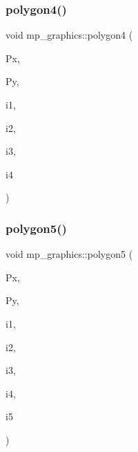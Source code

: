 \mbox{\label{classmp__graphics_acb344e1e44ad9f7fb2d1e8d6ae5bbf53}} 
\subsubsection{\texorpdfstring{polygon4()}{polygon4()}}
{\footnotesize\ttfamily void mp\+\_\+graphics\+::polygon4 (\begin{DoxyParamCaption}\item[{\mbox{\hyperlink{galois_8h_a09fddde158a3a20bd2dcadb609de11dc}{I\+NT}} $\ast$}]{Px,  }\item[{\mbox{\hyperlink{galois_8h_a09fddde158a3a20bd2dcadb609de11dc}{I\+NT}} $\ast$}]{Py,  }\item[{\mbox{\hyperlink{galois_8h_a09fddde158a3a20bd2dcadb609de11dc}{I\+NT}}}]{i1,  }\item[{\mbox{\hyperlink{galois_8h_a09fddde158a3a20bd2dcadb609de11dc}{I\+NT}}}]{i2,  }\item[{\mbox{\hyperlink{galois_8h_a09fddde158a3a20bd2dcadb609de11dc}{I\+NT}}}]{i3,  }\item[{\mbox{\hyperlink{galois_8h_a09fddde158a3a20bd2dcadb609de11dc}{I\+NT}}}]{i4 }\end{DoxyParamCaption})}

\mbox{\label{classmp__graphics_a5c2a62f1331cc9f598c4faa8d1116dca}} 
\subsubsection{\texorpdfstring{polygon5()}{polygon5()}}
{\footnotesize\ttfamily void mp\+\_\+graphics\+::polygon5 (\begin{DoxyParamCaption}\item[{\mbox{\hyperlink{galois_8h_a09fddde158a3a20bd2dcadb609de11dc}{I\+NT}} $\ast$}]{Px,  }\item[{\mbox{\hyperlink{galois_8h_a09fddde158a3a20bd2dcadb609de11dc}{I\+NT}} $\ast$}]{Py,  }\item[{\mbox{\hyperlink{galois_8h_a09fddde158a3a20bd2dcadb609de11dc}{I\+NT}}}]{i1,  }\item[{\mbox{\hyperlink{galois_8h_a09fddde158a3a20bd2dcadb609de11dc}{I\+NT}}}]{i2,  }\item[{\mbox{\hyperlink{galois_8h_a09fddde158a3a20bd2dcadb609de11dc}{I\+NT}}}]{i3,  }\item[{\mbox{\hyperlink{galois_8h_a09fddde158a3a20bd2dcadb609de11dc}{I\+NT}}}]{i4,  }\item[{\mbox{\hyperlink{galois_8h_a09fddde158a3a20bd2dcadb609de11dc}{I\+NT}}}]{i5 }\end{DoxyParamCaption})}

